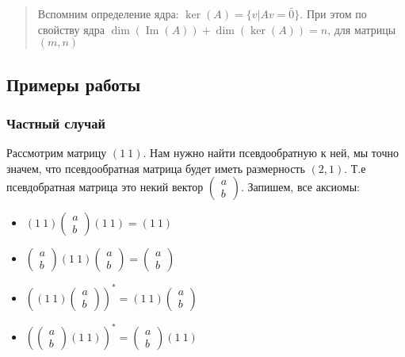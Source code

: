 \documentclass{article}
\begin{document}
    \begin{quote}
        Вспомним определение ядра: $\ker(A) = \{v | Av = \bar{0} \} $.
        При этом по свойству ядра $\dim(\operatorname{Im}(A)) + \dim(\ker(A)) = n$, для матрицы $(m, n)$
    \end{quote}

    \subsection{Примеры работы}

    \subsubsection{Частный случай}

    Рассмотрим матрицу $(1 \ 1)$.
    Нам нужно найти псевдообратную к ней, мы точно значем, что псевдообратная матрица будет иметь размерность $(2, 1)$.
    Т.е псевдобратная матрица это некий вектор \(\left(\begin{smallmatrix} a \\ b \end{smallmatrix}\right)\).
    Запишем, все аксиомы:

    \begin{itemize}
        \item $(1 \ 1) \left(\begin{smallmatrix} a \\ b \end{smallmatrix}\right) (1 \ 1) = (1 \ 1)$
        \item $\left(\begin{smallmatrix} a \\ b \end{smallmatrix}\right) (1 \ 1) \left(\begin{smallmatrix} a \\ b \end{smallmatrix}\right) = \left(\begin{smallmatrix} a \\ b \end{smallmatrix}\right) $
        \item $((1 \ 1) \left(\begin{smallmatrix} a \\ b \end{smallmatrix}\right))^{*} =  (1 \ 1) \left(\begin{smallmatrix} a \\ b \end{smallmatrix}\right)$
        \item $(\left(\begin{smallmatrix} a \\ b \end{smallmatrix}\right) (1 \ 1))^{*} = \left(\begin{smallmatrix} a \\ b \end{smallmatrix}\right) (1 \ 1)$
    \end{itemize}
\end{document}
